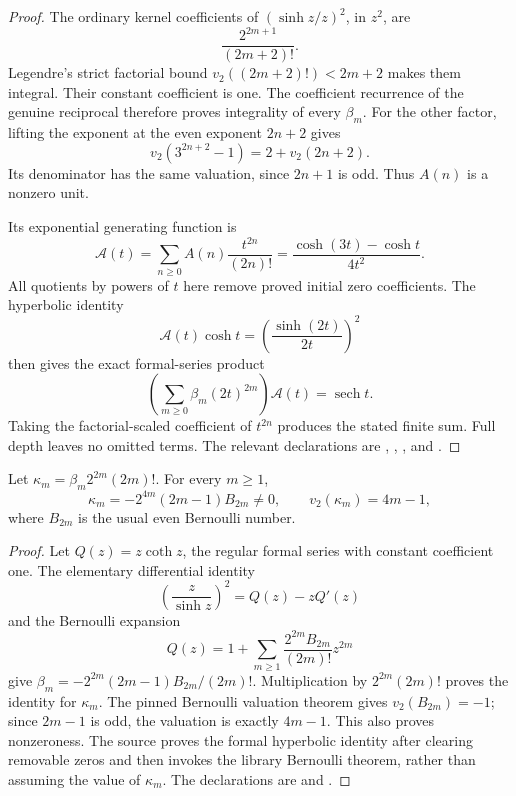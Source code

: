 \begin{proof}
The ordinary kernel coefficients of $(\sinh z/z)^2$, in $z^2$, are
\[
 \frac{2^{2m+1}}{(2m+2)!}.
\]
Legendre's strict factorial bound
$v_2((2m+2)!)<2m+2$ makes them integral.  Their constant coefficient is
one.  The coefficient recurrence of the genuine reciprocal therefore
proves integrality of every $\beta_m$.
For the other factor, lifting the exponent at the even exponent $2n+2$
gives
\[
 v_2(3^{2n+2}-1)=2+v_2(2n+2).
\]
Its denominator has the same valuation, since $2n+1$ is odd.  Thus
$A(n)$ is a nonzero unit.

Its exponential generating function is
\[
 \mathcal A(t)=\sum_{n\ge0}A(n)\frac{t^{2n}}{(2n)!}
             =\frac{\cosh(3t)-\cosh t}{4t^2}.
\]
All quotients by powers of $t$ here remove proved initial zero
coefficients.  The hyperbolic identity
\[
 \mathcal A(t)\cosh t=\left(\frac{\sinh(2t)}{2t}\right)^2
\]
then gives the exact formal-series product
\[
 \left(\sum_{m\ge0}\beta_m(2t)^{2m}\right)\mathcal A(t)
       =\operatorname{sech}t.
\]
Taking the factorial-scaled coefficient of $t^{2n}$ produces the stated
finite sum.  Full depth leaves no omitted terms.
The relevant declarations are
,
,
, and
.
\end{proof}

\begin{lemma}\label{lem:arith-kappa}
Let $\kappa_m=\beta_m2^{2m}(2m)!$.  For every $m\ge1$,
\[
 \kappa_m=-2^{4m}(2m-1)B_{2m}\ne0,\qquad
 v_2(\kappa_m)=4m-1,
\]
where $B_{2m}$ is the usual even Bernoulli number.
\end{lemma}

\begin{proof}
Let $Q(z)=z\coth z$, the regular formal series with constant coefficient
one.  The elementary differential identity
\[
 \left(\frac z{\sinh z}\right)^2=Q(z)-zQ'(z)
\]
and the Bernoulli expansion
\[
 Q(z)=1+\sum_{m\ge1}\frac{2^{2m}B_{2m}}{(2m)!}z^{2m}
\]
give
$\beta_m=-2^{2m}(2m-1)B_{2m}/(2m)!$.
Multiplication by $2^{2m}(2m)!$ proves the identity for $\kappa_m$.
The pinned Bernoulli valuation theorem gives $v_2(B_{2m})=-1$;
since $2m-1$ is odd, the valuation is exactly $4m-1$.
This also proves nonzeroness.  The source proves the formal hyperbolic
identity after clearing removable zeros and then invokes the library
Bernoulli theorem, rather than assuming the value of $\kappa_m$.
The declarations are
 and
.
\end{proof}

